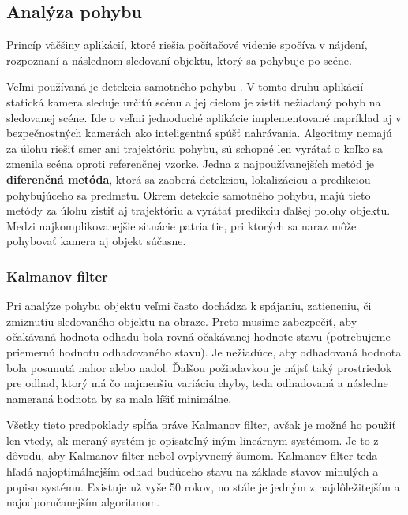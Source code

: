 \subsection{Analýza pohybu }
Princíp väčšiny aplikácií, ktoré riešia počítačové videnie spočíva v nájdení, rozpoznaní a následnom sledovaní objektu, ktorý sa pohybuje po scéne. 

Veľmi používaná je detekcia samotného pohybu \cite{pocitacove_videnie_v_praxi}. V tomto druhu aplikácií statická kamera sleduje určitú scénu a jej cieľom je zistiť nežiadaný pohyb na sledovanej scéne. Ide o veľmi jednoduché aplikácie implementované napríklad aj v bezpečnostných kamerách ako inteligentná spúšť nahrávania. Algoritmy nemajú za úlohu riešiť smer ani trajektóriu pohybu, sú schopné len vyrátať o koľko sa zmenila scéna oproti referenčnej vzorke. Jedna z najpoužívanejších metód je \textbf{diferenčná metóda}, ktorá sa zaoberá detekciou, lokalizáciou a predikciou pohybujúceho sa predmetu. Okrem detekcie samotného pohybu, majú tieto metódy za úlohu zistiť aj trajektóriu a vyrátať predikciu ďalšej polohy objektu. Medzi najkomplikovanejšie situácie patria tie, pri ktorých sa naraz môže pohybovať kamera aj objekt súčasne. \cite{pocitacove_videnie_v_praxi}

\subsubsection{Kalmanov filter}
\label{sec:kalman}
Pri analýze pohybu objektu veľmi často dochádza k spájaniu, zatieneniu, či zmiznutiu sledovaného objektu na obraze. Preto musíme zabezpečiť, aby očakávaná hodnota odhadu bola rovná očakávanej hodnote stavu (potrebujeme priemernú hodnotu odhadovaného stavu). Je nežiadúce, aby odhadovaná hodnota bola posunutá nahor alebo nadol. Ďalšou požiadavkou je nájsť taký prostriedok pre odhad, ktorý má čo najmenšiu variáciu chyby, teda odhadovaná a následne nameraná hodnota by sa mala líšiť minimálne. \cite{Kalman_web} 

Všetky tieto predpoklady spĺňa práve Kalmanov filter, avšak je možné ho použiť len vtedy, ak  meraný systém je opísateľný iným lineárnym systémom. Je to z dôvodu, aby Kalmanov filter nebol ovplyvnený šumom. Kalmanov filter teda hľadá najoptimálnejším odhad budúceho stavu na základe stavov minulých a popisu systému. Existuje už vyše 50 rokov, no stále je jedným z najdôležitejším a najodporučanejším algoritmom. \cite{Kalman_web}

